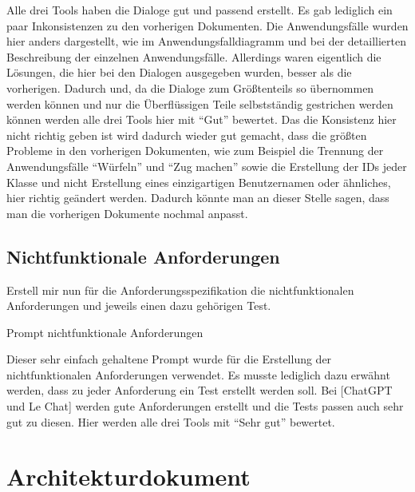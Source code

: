 Alle drei Tools haben die Dialoge gut und passend erstellt. Es gab lediglich ein paar Inkonsistenzen zu den vorherigen Dokumenten. Die Anwendungsfälle wurden 
hier anders dargestellt, wie im Anwendungsfalldiagramm und bei der detaillierten Beschreibung der einzelnen Anwendungsfälle. Allerdings waren eigentlich die 
Lösungen, die hier bei den Dialogen ausgegeben wurden, besser als die vorherigen. Dadurch und, da die Dialoge zum Größtenteils so übernommen werden können 
und nur die Überflüssigen Teile selbstständig gestrichen werden können werden alle drei Tools hier mit ``Gut'' bewertet. Das die Konsistenz hier 
nicht richtig geben ist wird dadurch wieder gut gemacht, dass die größten Probleme in den vorherigen Dokumenten, wie zum Beispiel die Trennung der Anwendungsfälle 
``Würfeln'' und ``Zug machen'' sowie die Erstellung der IDs jeder Klasse und nicht Erstellung eines einzigartigen Benutzernamen oder ähnliches, hier richtig 
geändert werden. Dadurch könnte man an dieser Stelle sagen, dass man die vorherigen Dokumente nochmal anpasst. 

\subsection*{Nichtfunktionale Anforderungen}

\begin{prompt}[H]
    \begin{tcolorbox}[colback=gray!20, colframe=gray!20, boxrule=0pt, sharp corners] 
        Erstell mir nun für die Anforderungsspezifikation die nichtfunktionalen Anforderungen und jeweils einen dazu gehörigen Test.
        \vfill
    \end{tcolorbox}
    \caption{Prompt nichtfunktionale Anforderungen}
    \label{Prompt nichtfunktionale Anforderungen}
\end{prompt}

Dieser sehr einfach gehaltene Prompt wurde für die Erstellung der nichtfunktionalen Anforderungen verwendet. Es musste lediglich dazu erwähnt werden,
dass zu jeder Anforderung ein Test erstellt werden soll. Bei [ChatGPT und Le Chat] werden gute Anforderungen erstellt und die Tests passen auch 
sehr gut zu diesen. Hier werden alle drei Tools mit ``Sehr gut'' bewertet.

\section{Architekturdokument}  \label{CompArchitekturdokument}

